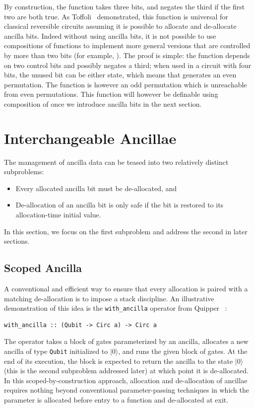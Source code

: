 \documentclass[sigplan,10pt,review,anonymous]{acmart}
\newcommand{\ket}[1]{|#1\rangle}
\begin{document}
By construction, the  function takes three bits,
and negates the third if the first two are both true. As
Toffoli~\cite{Toffoli:1980} demonstrated, this function is universal
for classical reversible circuits assuming it is possible to allocate
and de-allocate ancilla bits. Indeed without using ancilla bits, it is
not possible to use compositions of  functions
to implement more general versions that are controlled by more than
two bits (for example, ). The proof is simple:
the  function depends on two control bits and
possibly negates a third; when used in a circuit with four bits, the
unused bit can be either state, which means that
 generates an even permutation. The function
 is however an odd permutation which is
unreachable from even permutations.
This function will however be definable using composition of
 once we introduce ancilla bits in the next section.

\section{Interchangeable Ancillae}
\label{sec:dyn}

The management of ancilla data can be teased into two relatively
distinct subproblems:
\begin{itemize}
\item Every allocated ancilla bit must be de-allocated, and
\item De-allocation of an ancilla bit is only safe if the bit is
  restored to its allocation-time initial value.
\end{itemize}
In this section, we focus on the first subproblem and address the
second in later sections.

\subsection{Scoped Ancilla}

A conventional and efficient way to ensure that every allocation is
paired with a matching de-allocation is to impose a stack
discipline. An illustrative demonstration of this idea is the
\verb|with_ancilla| operator from
Quipper~\cite{Green:2013:QSQ:2491956.2462177} :
\begin{verbatim}
with_ancilla :: (Qubit -> Circ a) -> Circ a
\end{verbatim}
The operator takes a block of gates parameterized by an ancilla,
allocates a new ancilla of type \verb|Qubit| initialized to $\ket{0}$,
and runs the given block of gates. At the end of its execution, the
block is expected to return the ancilla to the state $\ket{0}$ (this
is the second subproblem addressed later) at which point it is
de-allocated. In this scoped-by-construction approach, allocation and
de-allocation of ancillae requires nothing beyond conventional
parameter-passing techniques in which the parameter is allocated
before entry to a function and de-allocated at exit.
\end{document}
